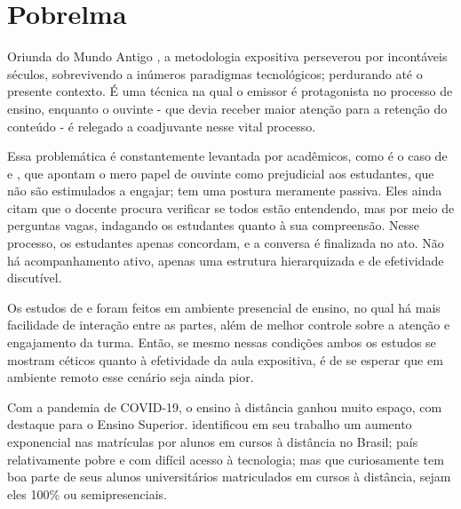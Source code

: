 \section{Pobrelma}
Oriunda do Mundo Antigo \cite{andreataAulaExpositivaPaulo2019}, a metodologia expositiva perseverou por incontáveis séculos, sobrevivendo a inúmeros paradigmas tecnológicos; perdurando até o presente contexto. É uma técnica na qual o emissor é protagonista no processo de ensino, enquanto o ouvinte - que devia receber maior atenção para a retenção do conteúdo - é relegado a coadjuvante nesse vital processo.

Essa problemática é constantemente levantada por acadêmicos, como é o caso de \cite{vasconcellosMetodologiaDialeticaEm1992} e \cite{pereiraCriticaMetodologiaTradicional2022}, que apontam o mero papel de ouvinte como prejudicial aos estudantes, que não são estimulados a engajar; tem uma postura meramente passiva. Eles ainda citam que o docente procura verificar se todos estão entendendo, mas por meio de perguntas vagas, indagando os estudantes quanto à sua compreensão. Nesse processo, os estudantes apenas concordam, e a conversa é finalizada no ato. Não há acompanhamento ativo, apenas uma estrutura hierarquizada e de efetividade discutível.

Os estudos de \cite{vasconcellosMetodologiaDialeticaEm1992} e \cite{pereiraCriticaMetodologiaTradicional2022} foram feitos em ambiente presencial de ensino, no  qual há mais facilidade de interação entre as partes, além de melhor controle sobre a atenção e engajamento da turma. Então, se mesmo nessas condições ambos os estudos se mostram céticos quanto à efetividade da aula expositiva, é de se esperar que em ambiente remoto esse cenário seja ainda pior.

Com a pandemia de COVID-19, o ensino à distância ganhou muito espaço, com destaque para o Ensino Superior. \cite{moranEnsinoSuperiorDistancia2009} identificou em seu trabalho um aumento exponencial nas matrículas por alunos em cursos à distância no Brasil; país relativamente pobre e com difícil acesso à tecnologia; mas que curiosamente tem boa parte de seus alunos universitários matriculados em cursos à distância, sejam eles 100\% ou semipresenciais.



